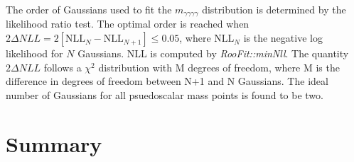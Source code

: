 \documentclass[12pt]{article}
\begin{document}
The order of Gaussians used to fit the $m_{\gamma \gamma \gamma \gamma}$ distribution is determined by the likelihood ratio test. The optimal order is reached when $2\Delta NLL = 2[\text{NLL}_{N} - \text{NLL}_{N+1}] \leq 0.05$, where $\text{NLL}_{N}$ is the negative log likelihood for $N$ Gaussians. NLL is computed by \textit{RooFit::minNll}. The quantity $2\Delta NLL$ follows a $\chi^2$ distribution with M degrees of freedom, where M is the difference in degrees of freedom between N+1 and N Gaussians. The ideal number of Gaussians for all psuedoscalar mass points is found to be two.\par

\section{Summary}

\newpage
\printbibliography
\end{document}
